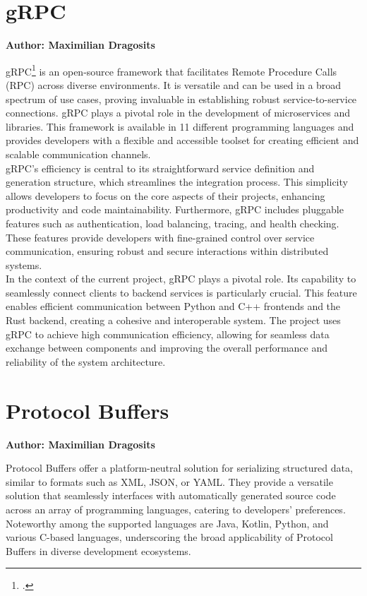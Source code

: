 \section{gRPC}
\textbf{Author: Maximilian Dragosits}

gRPC\footcite{grpc_main_site} is an open-source framework that facilitates Remote Procedure Calls (RPC) across diverse environments. It is versatile 
and can be used in a broad spectrum of use cases, proving invaluable in establishing robust service-to-service connections. gRPC plays a pivotal role in the 
development of microservices and libraries. This framework is available in 11 different programming languages and provides developers with a flexible 
and accessible toolset for creating efficient and scalable communication channels.\\

gRPC's efficiency is central to its straightforward service definition and generation structure, which streamlines the integration process. 
This simplicity allows developers to focus on the core aspects of their projects, enhancing productivity and code maintainability. Furthermore, gRPC includes 
pluggable features such as authentication, load balancing, tracing, and health checking. These features provide developers with fine-grained control over 
service communication, ensuring robust and secure interactions within distributed systems.\\

In the context of the current project, gRPC plays a pivotal role. Its capability to seamlessly connect clients to backend services is particularly crucial. 
This feature enables efficient communication between Python and C++ frontends and the Rust backend, creating a cohesive and interoperable system. The project 
uses gRPC to achieve high communication efficiency, allowing for seamless data exchange between components and improving the overall performance and reliability 
of the system architecture.

\section{Protocol Buffers}
\textbf{Author: Maximilian Dragosits}

Protocol Buffers offer a platform-neutral solution for serializing structured data, similar to formats such as XML, JSON, or YAML. They provide a versatile 
solution that seamlessly interfaces with automatically generated source code across an array of programming languages, catering to developers' preferences. 
Noteworthy among the supported languages are Java, Kotlin, Python, and various C-based languages, underscoring the broad applicability of Protocol Buffers 
in diverse development ecosystems.\\

